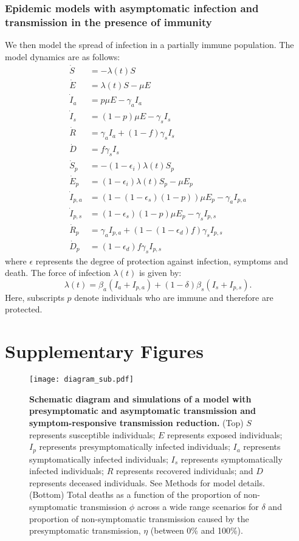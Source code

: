 \documentclass[12pt]{article}
\begin{document}
\subsubsection*{Epidemic models with asymptomatic infection and transmission in the presence of immunity}

We then model the spread of infection in a partially immune population.
The model dynamics are as follows:
\begin{align}
\dot{S} &= -\lambda (t) S \\
\dot{E} &= \lambda (t) S - \mu E\\
\dot{I}_a &= p \mu E - \gamma_a I_a\\
\dot{I}_s &= (1-p) \mu E -\gamma_s I_s\\
\dot{R} &= \gamma_a I_a + (1-f) \gamma_s I_s \\
\dot{D} &= f \gamma_s I_s\\
\dot{S}_p &= - (1-\epsilon_i) \lambda (t) S_p \\
\dot{E}_p &= (1-\epsilon_i) \lambda (t) S_p - \mu E_p\\
\dot{I}_{p, a} &= (1 - (1-\epsilon_s) (1-p)) \mu E_p - \gamma_a I_{p,a}\\
\dot{I}_{p, s} &= (1-\epsilon_s) (1-p) \mu E_p -\gamma_s I_{p,s}\\
\dot{R}_p &= \gamma_a I_{p,a} + (1-(1-\epsilon_d) f) \gamma_s I_{p,s} \\
\dot{D}_p &= (1-\epsilon_d) f \gamma_s I_{p,s}
\end{align}
where $\epsilon$ represents the degree of protection against infection, symptoms and death. 
The force of infection $\lambda(t)$ is given by:
\begin{equation}
\lambda(t) = \beta_a (I_a + I_{p,a}) + (1-\delta) \beta_s (I_s + I_{p,s}).
\end{equation}
Here, subscripts $p$ denote individuals who are immune and therefore are protected.

\pagebreak

\section*{Supplementary Figures}

\begin{figure}[!ht]
\begin{center}
\texttt{[image: diagram\_sub.pdf]}
\caption{
\textbf{Schematic diagram and simulations of a model with presymptomatic and asymptomatic transmission and symptom-responsive transmission reduction.}
(Top) $S$ represents susceptible individuals; $E$ represents exposed individuals; $I_p$ represents presymptomatically infected individuals; $I_a$ represents symptomatically infected individuals; $I_s$ represents symptomatically infected individuals; $R$ represents recovered individuals; and $D$ represents deceased individuals. See Methods for model details.
(Bottom) Total deaths as a function of the proportion of non-symptomatic transmission $\phi$ across a wide range scenarios for $\delta$ and proportion of non-symptomatic transmission caused by the presymptomatic transmission, $\eta$ (between 0\% and 100\%). 
}
\end{center}
\end{figure}

\pagebreak


\end{document}
